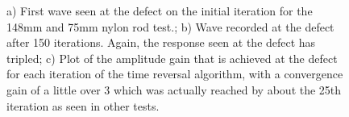 \documentclass[11pt,letterpaper]{article}%
\begin{document}
\begin{figure}
   \caption[all]
   { \label{nylonExp2}
   a) First wave seen at the defect on the initial iteration for the 148mm and 75mm nylon rod test.; b) Wave recorded at the defect after 150 iterations. Again, the response seen at the defect has tripled; c) Plot of the amplitude gain that is achieved at the defect for each iteration of the time reversal algorithm, with a convergence gain of a little over 3 which was actually reached by about the 25th iteration as seen in other tests.
 }
\end{figure}

 \begin{figure}
\begin{subfigmatrix}{3}
\end{subfigmatrix}


\end{figure}
\end{document}
